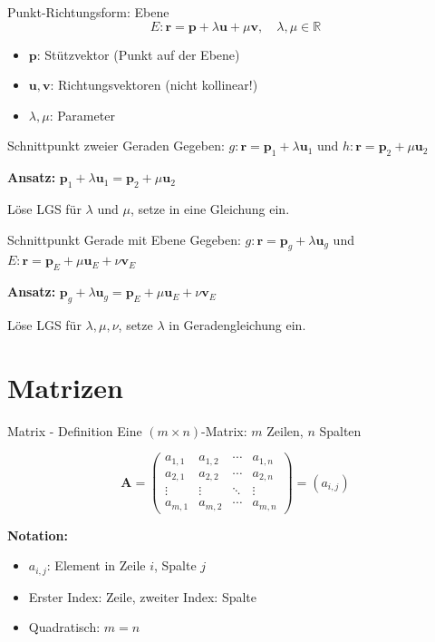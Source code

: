 \documentclass[a4paper, fontsize=7pt]{scrartcl}
\def\R{\mathbb{R}}
\begin{document}
\begin{mainbox}{Punkt-Richtungsform: Ebene}
$$E: \mathbf{r} = \mathbf{p} + \lambda \mathbf{u} + \mu \mathbf{v}, \quad \lambda, \mu \in \R$$

\begin{itemize}
    \item $\mathbf{p}$: Stützvektor (Punkt auf der Ebene)
    \item $\mathbf{u}, \mathbf{v}$: Richtungsvektoren (nicht kollinear!)
    \item $\lambda, \mu$: Parameter
\end{itemize}
\end{mainbox}

\begin{subbox}{Schnittpunkt zweier Geraden}
Gegeben: $g: \mathbf{r} = \mathbf{p}_1 + \lambda \mathbf{u}_1$ und $h: \mathbf{r} = \mathbf{p}_2 + \mu \mathbf{u}_2$

\textbf{Ansatz:} $\mathbf{p}_1 + \lambda \mathbf{u}_1 = \mathbf{p}_2 + \mu \mathbf{u}_2$

Löse LGS für $\lambda$ und $\mu$, setze in eine Gleichung ein.
\end{subbox}

\begin{subbox}{Schnittpunkt Gerade mit Ebene}
Gegeben: $g: \mathbf{r} = \mathbf{p}_g + \lambda \mathbf{u}_g$ und $E: \mathbf{r} = \mathbf{p}_E + \mu \mathbf{u}_E + \nu \mathbf{v}_E$

\textbf{Ansatz:} $\mathbf{p}_g + \lambda \mathbf{u}_g = \mathbf{p}_E + \mu \mathbf{u}_E + \nu \mathbf{v}_E$

Löse LGS für $\lambda, \mu, \nu$, setze $\lambda$ in Geradengleichung ein.
\end{subbox}

\section{Matrizen}

\begin{mainbox}{Matrix - Definition}
Eine $(m \times n)$-Matrix: $m$ Zeilen, $n$ Spalten

$$\mathbf{A} = \begin{pmatrix}
a_{1,1} & a_{1,2} & \cdots & a_{1,n} \\
a_{2,1} & a_{2,2} & \cdots & a_{2,n} \\
\vdots & \vdots & \ddots & \vdots \\
a_{m,1} & a_{m,2} & \cdots & a_{m,n}
\end{pmatrix} = (a_{i,j})$$

\textbf{Notation:}
\begin{itemize}
    \item $a_{i,j}$: Element in Zeile $i$, Spalte $j$
    \item Erster Index: Zeile, zweiter Index: Spalte
    \item Quadratisch: $m = n$
\end{itemize}
\end{mainbox}
\end{document}
